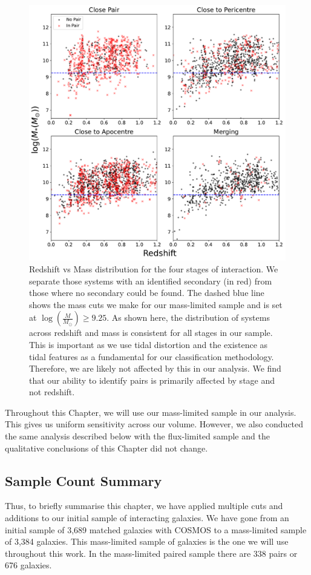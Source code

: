 \begin{figure}
\centering
\includegraphics[width=\textwidth]{Chapter3/figures/redshift-limitations.pdf}
\caption[Redshift vs Mass distribution for each stage of interaction we have defined.]{Redshift vs Mass distribution for the four stages of interaction. We separate those systems with an identified secondary (in red) from those where no secondary could be found. The dashed blue line shows the mass cuts we make for our mass-limited sample and is set at $\log(\frac{M}{M_\odot}) \geq 9.25$. As shown here, the distribution of systems across redshift and mass is consistent for all stages in our sample. This is important as we use tidal distortion and the existence as tidal features as a fundamental for our classification methodology. Therefore, we are likely not affected by this in our analysis. We find that our ability to identify pairs is primarily affected by stage and not redshift.}
\label{fig:redshift_selection}
\end{figure}

Throughout this Chapter, we will use our mass-limited sample in our analysis. This gives us uniform sensitivity across our volume. However, we also conducted the same analysis described below with the flux-limited sample and the qualitative conclusions of this Chapter did not change.

\subsection{Sample Count Summary}\label{sec:sample-summary}
\noindent Thus, to briefly summarise this chapter, we have applied multiple cuts and additions to our initial sample of interacting galaxies. We have gone from an initial sample of 3,689 matched galaxies with COSMOS to a mass-limited sample of 3,384 galaxies. This mass-limited sample of galaxies is the one we will use throughout this work. In the mass-limited paired sample there are 338 pairs or 676 galaxies.

